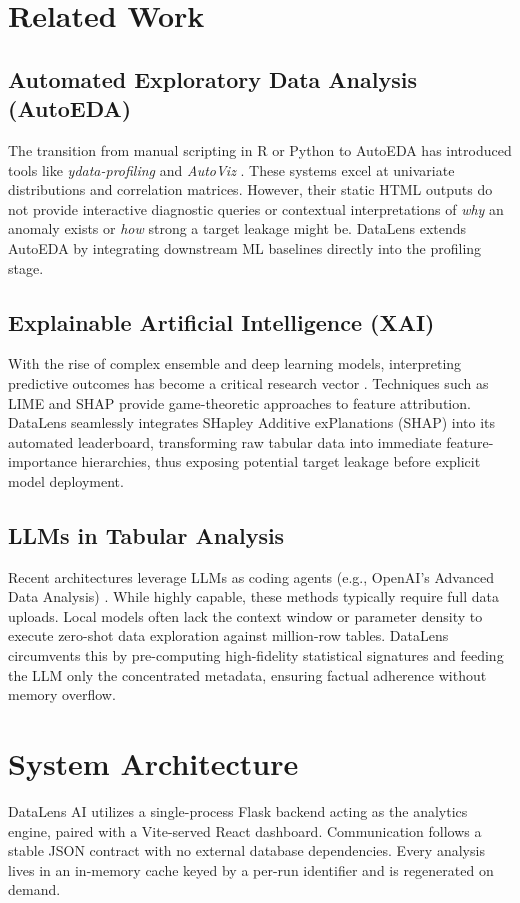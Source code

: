 \documentclass[conference]{IEEEtran}
\begin{document}
\section{Related Work}
\subsection{Automated Exploratory Data Analysis (AutoEDA)}
The transition from manual scripting in R or Python to AutoEDA has introduced tools like \textit{ydata-profiling} and \textit{AutoViz} \cite{bruce2020}. These systems excel at univariate distributions and correlation matrices. However, their static HTML outputs do not provide interactive diagnostic queries or contextual interpretations of \textit{why} an anomaly exists or \textit{how} strong a target leakage might be. DataLens extends AutoEDA by integrating downstream ML baselines directly into the profiling stage.

\subsection{Explainable Artificial Intelligence (XAI)}
With the rise of complex ensemble and deep learning models, interpreting predictive outcomes has become a critical research vector \cite{lundberg2017shap}. Techniques such as LIME and SHAP provide game-theoretic approaches to feature attribution. DataLens seamlessly integrates SHapley Additive exPlanations (SHAP) into its automated leaderboard, transforming raw tabular data into immediate feature-importance hierarchies, thus exposing potential target leakage before explicit model deployment.

\subsection{LLMs in Tabular Analysis}
Recent architectures leverage LLMs as coding agents (e.g., OpenAI's Advanced Data Analysis) \cite{wang2023}. While highly capable, these methods typically require full data uploads. Local models often lack the context window or parameter density to execute zero-shot data exploration against million-row tables. DataLens circumvents this by pre-computing high-fidelity statistical signatures and feeding the LLM only the concentrated metadata, ensuring factual adherence without memory overflow.

\section{System Architecture}\label{sec:arch}
DataLens AI utilizes a single-process Flask backend acting as the analytics engine, paired with a Vite-served React dashboard. Communication follows a stable JSON contract with no external database dependencies. Every analysis lives in an in-memory cache keyed by a per-run identifier and is regenerated on demand.
\end{document}
